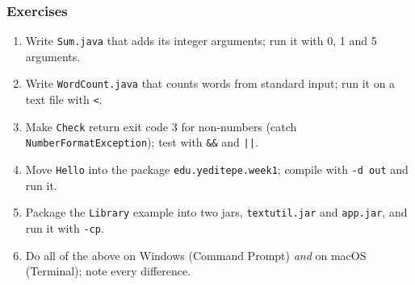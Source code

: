 \documentclass[aspectratio=169,10pt,compress]{beamer}
\begin{document}
\begin{frame}[t,fragile] \frametitle{Exercises}
  \begin{enumerate}\small
    \item Write \texttt{Sum.java} that adds its integer arguments; run it with 0, 1 and 5 arguments.
    \item Write \texttt{WordCount.java} that counts words from standard input; run it on a text file with \texttt{<}.
    \item Make \texttt{Check} return exit code 3 for non-numbers (catch \texttt{NumberFormatException}); test with \texttt{\&\&} and \texttt{||}.
    \item Move \texttt{Hello} into the package \texttt{edu.yeditepe.week1}; compile with \texttt{-d out} and run it.
    \item Package the \texttt{Library} example into two jars, \texttt{textutil.jar} and \texttt{app.jar}, and run it with \texttt{-cp}.
    \item Do all of the above on Windows (Command Prompt) \emph{and} on macOS (Terminal); note every difference.
  \end{enumerate}
\end{frame}




\begin{frame}[t,fragile]
	\begin{center}
		\vspace{4cm}
	\end{center}
\end{frame}
\end{document}

